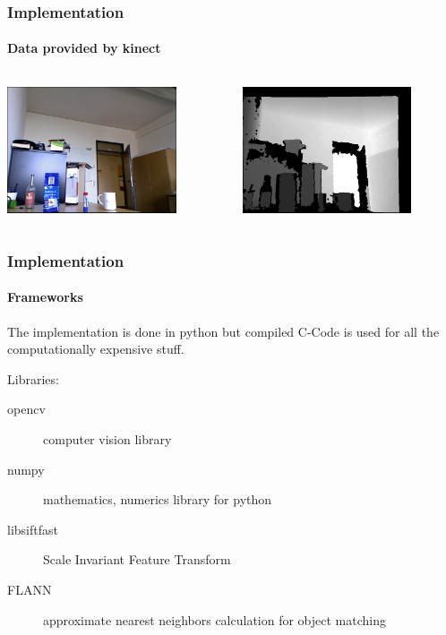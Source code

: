 \documentclass[]{beamer}
\begin{document}
\begin{frame}
    \frametitle{Implementation}
    \framesubtitle{Data provided by kinect}
    \begin{columns}
        \begin{column}{5 cm} 
            \centering
            \includegraphics[width=5cm]{../images/image.jpg}
            
        \end{column}
        \begin{column}{5 cm}
            \centering
            \includegraphics[width=5cm]{../images/depth.jpg}
        \end{column}
    \end{columns}
\end{frame}


\begin{frame}
    \frametitle{Implementation}
    \framesubtitle{Frameworks}
    
    The implementation is done in python but compiled C-Code is used for all the computationally expensive stuff.
    
    \vspace{0.4cm}
    
    Libraries:
    \begin{description}
        \item[opencv] computer vision library
        \item[numpy] mathematics, numerics library for python
        \item[libsiftfast] Scale Invariant Feature Transform
        \item[FLANN] approximate nearest neighbors calculation for object matching
    \end{description}
\end{frame}
\end{document}
